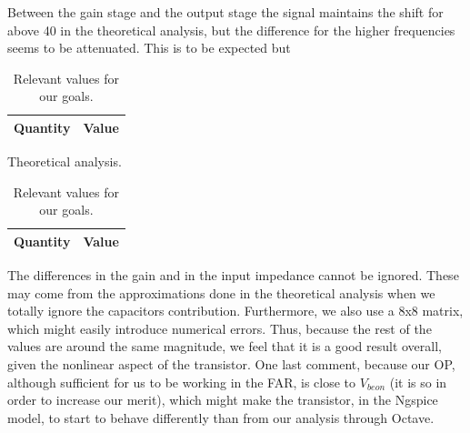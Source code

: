 Between the gain stage and the output stage the signal maintains the shift for above 40 in the theoretical analysis, but the difference for the higher frequencies seems to be attenuated. This is to be expected but 



\begin{table}[H]
    \begin{minipage}{.5\textwidth}
    \centering
    \vspace{3mm}
    \begin{table}[H]
    \centering
        \centering
        \begin{tabular}{c|c}
        \textbf{Quantity} & \textbf{Value}\\
    
    \hline
    \end{tabular}
    \label{tab:quantities_side_octave}
    \end{table}
    \vspace{6mm}
    \caption{Theoretical analysis.}
    \end{minipage}
    \begin{minipage}{.5\textwidth}
        \begin{table}[H]
        \centering
        \begin{tabular}{c|c}
        \textbf{Quantity} & \textbf{Value}\\
        \hline
        \hline
        
        
        
    \end{tabular}
        \caption{Simulation analysis}
        \label{tab:quantaties_side_ngspice}
    \end{table}
    \end{minipage}
    \caption{Relevant values for our goals.} 
\end{table}

The differences in the gain and in the input impedance cannot be ignored. These may come from the approximations done in the  theoretical analysis when we totally ignore the capacitors contribution. Furthermore, we also use a 8x8 matrix, which might easily introduce numerical errors. Thus, because the rest of the values are around the same magnitude, we feel that it is a good result overall, given the nonlinear aspect of the transistor. One last comment, because our OP, although sufficient for us to be working in the FAR, is close to $V_{beon}$ (it is so in order to increase our merit), which might make the transistor, in the Ngspice model, to start to behave differently than from our analysis through Octave. 